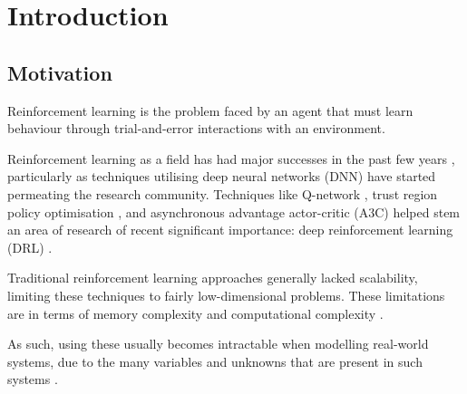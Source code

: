 
\chapter{Introduction} %
\label{Chapter1} %


\newcommand{\keyword}[1]{\textbf{#1}}
\newcommand{\tabhead}[1]{\textbf{#1}}
\newcommand{\code}[1]{\texttt{#1}}
\newcommand{\file}[1]{\texttt{\bfseries#1}}
\newcommand{\option}[1]{\texttt{\itshape#1}}


\section{Motivation}
\label{motivation}

Reinforcement learning is the problem faced by an agent that must learn behaviour through trial-and-error interactions with an environment.

Reinforcement learning as a field has had major successes in the past few years \parencite{tesauro1995temporal, singh2002optimizing, kohl2004policy, ng2006autonomous}, particularly as techniques utilising deep neural networks (DNN) have started permeating the research community. Techniques like Q-network \parencite{mnih2015human}, trust region policy optimisation \parencite{schulman2015trust}, and asynchronous advantage actor-critic (A3C) \parencite{mnih2016asynchronous} helped stem an area of research of recent significant importance: deep reinforcement learning (DRL) \parencite{DBLP:journals/corr/abs-1708-05866}.

Traditional reinforcement learning approaches generally lacked scalability, limiting these techniques to fairly low-dimensional problems. These limitations are in terms of memory complexity and computational complexity \parencite{kaelbling1996reinforcement}.

As such, using these usually becomes intractable when modelling real-world systems, due to the many variables and unknowns that are present in such systems \parencite{strehl2006pac}.

